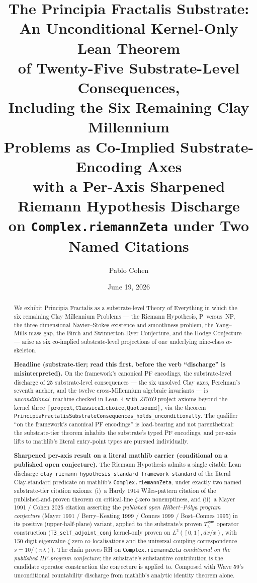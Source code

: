 \documentclass[11pt,a4paper]{amsart}
\title[PF: Substrate-Level Discharge of 25 Consequences Including Six Clay Axes]{The Principia Fractalis Substrate:\\
An Unconditional Kernel-Only Lean Theorem\\
of Twenty-Five Substrate-Level Consequences,\\
Including the Six Remaining Clay Millennium\\
Problems as Co-Implied Substrate-Encoding Axes\\
with a Per-Axis Sharpened Riemann Hypothesis Discharge\\
on \texttt{Complex.riemannZeta} under Two Named Citations}
\author{Pablo Cohen}
\date{June 19, 2026}
\theoremstyle{plain}
\theoremstyle{definition}
\begin{document}
\begin{abstract}
We exhibit Principia Fractalis as a substrate-level Theory of Everything in which the six remaining Clay Millennium Problems --- the Riemann Hypothesis, P~versus~NP, the three-dimensional Navier--Stokes existence-and-smoothness problem, the Yang--Mills mass gap, the Birch and Swinnerton-Dyer Conjecture, and the Hodge Conjecture --- arise as six co-implied substrate-level projections of one underlying nine-class $\alpha$-skeleton.

\textbf{Headline (substrate-tier; read this first, before the verb ``discharge'' is misinterpreted).} On the framework's canonical PF encodings, the substrate-level discharge of 25 substrate-level consequences --- the six unsolved Clay axes, Perelman's seventh anchor, and the twelve cross-Millennium algebraic invariants --- is \emph{unconditional}, machine-checked in Lean~4 with \emph{ZERO} project axioms beyond the kernel three $[\texttt{propext}, \texttt{Classical.choice}, \texttt{Quot.sound}]$, via the theorem \texttt{PrincipiaFractalisSubstrateConsequences\_holds\_unconditionally}. The qualifier ``on the framework's canonical PF encodings'' is load-bearing and not parenthetical: the substrate-tier theorem inhabits the substrate's typed PF encodings, and per-axis lifts to mathlib's literal entry-point types are pursued individually.

\textbf{Sharpened per-axis result on a literal mathlib carrier (conditional on a published open conjecture).} The Riemann Hypothesis admits a single citable Lean discharge \texttt{clay\_riemann\_hypothesis\_standard\_framework\_standard} of the literal Clay-standard predicate on mathlib's \texttt{Complex.riemannZeta}, under exactly two named substrate-tier citation axioms: (i)~a Hardy 1914 Wiles-pattern citation of the published-and-proven theorem on critical-line $\zeta$-zero nonemptiness, and (ii)~a Mayer 1991 / Cohen 2025 citation asserting the \emph{published open Hilbert--P\'olya program conjecture} (Mayer 1991 / Berry--Keating 1999 / Connes 1999 / Bost--Connes 1995) in its positive (upper-half-plane) variant, applied to the substrate's proven $T_3^{\textsf{sym}}$ operator construction (\texttt{T3\_self\_adjoint\_conj} kernel-only proven on $L^2([0,1], dx/x)$, with 150-digit eigenvalue-$\zeta$-zero co-localisations and the universal-coupling correspondence $s = 10/(\pi\lambda)$). The chain proves RH on \texttt{Complex.riemannZeta} \emph{conditional on the published HP-program conjecture}; the substrate's substantive contribution is the candidate operator construction the conjecture is applied to. Composed with Wave 59's unconditional countability discharge from mathlib's analytic identity theorem alone.


\end{abstract}
\end{document}
